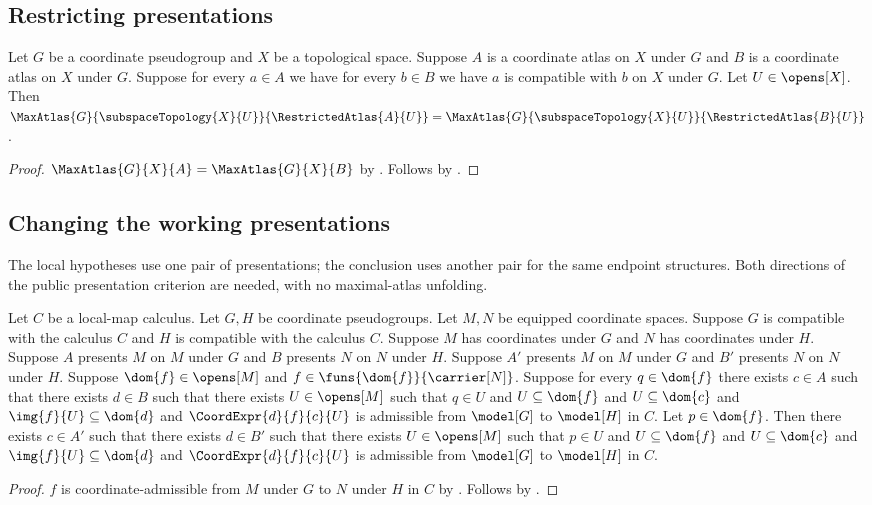 \subsection{Restricting presentations}

\begin{theorem}\label{restricted_presentations_same_maximal_atlas}
    Let $G$ be a coordinate pseudogroup and $X$ be a topological space.
    Suppose $A$ is a coordinate atlas on $X$ under $G$ and $B$ is a coordinate atlas on $X$ under $G$.
    Suppose for every $a\in A$ we have for every $b\in B$ we have
        $a$ is compatible with $b$ on $X$ under $G$.
    Let $U\in\opens[X]$.
    Then $\MaxAtlas{G}{\subspaceTopology{X}{U}}{\RestrictedAtlas{A}{U}}
        =\MaxAtlas{G}{\subspaceTopology{X}{U}}{\RestrictedAtlas{B}{U}}$.
\end{theorem}
\begin{proof}
    $\MaxAtlas{G}{X}{A}=\MaxAtlas{G}{X}{B}$ by .
    Follows by .
\end{proof}

\subsection{Changing the working presentations}

The local hypotheses use one pair of presentations; the conclusion uses
another pair for the same endpoint structures. Both directions of the public
presentation criterion are needed, with no maximal-atlas unfolding.

\begin{theorem}\label{coordinate_map_presentation_replacement}
    Let $C$ be a local-map calculus.
    Let $G,H$ be coordinate pseudogroups.
    Let $M,N$ be equipped coordinate spaces.
    Suppose $G$ is compatible with the calculus $C$ and $H$ is compatible with the calculus $C$.
    Suppose $M$ has coordinates under $G$ and $N$ has coordinates under $H$.
    Suppose $A$ presents $M$ on $M$ under $G$ and $B$ presents $N$ on $N$ under $H$.
    Suppose $A'$ presents $M$ on $M$ under $G$ and $B'$ presents $N$ on $N$ under $H$.
    Suppose $\dom{f}\in\opens[M]$ and $f\in\funs{\dom{f}}{\carrier[N]}$.
    Suppose for every $q\in\dom{f}$ there exists $c\in A$ such that there exists $d\in B$
        such that there exists $U\in\opens[M]$ such that
            $q\in U$ and $U\subseteq\dom{f}$ and $U\subseteq\dom{c}$ and
            $\img{f}{U}\subseteq\dom{d}$ and
            $\CoordExpr{d}{f}{c}{U}$ is admissible from $\model[G]$ to $\model[H]$ in $C$.
    Let $p\in\dom{f}$.
    Then there exists $c\in A'$ such that there exists $d\in B'$
        such that there exists $U\in\opens[M]$ such that
            $p\in U$ and $U\subseteq\dom{f}$ and $U\subseteq\dom{c}$ and
            $\img{f}{U}\subseteq\dom{d}$ and
            $\CoordExpr{d}{f}{c}{U}$ is admissible from $\model[G]$ to $\model[H]$ in $C$.
\end{theorem}
\begin{proof}
    $f$ is coordinate-admissible from $M$ under $G$ to $N$ under $H$ in $C$ by
        .
    Follows by .
\end{proof}

